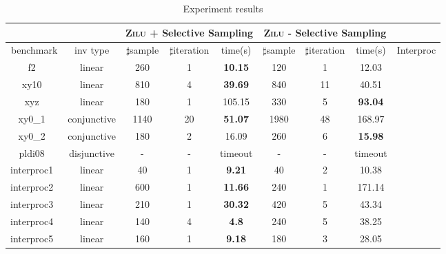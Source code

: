 \begin{table}[t]
\scriptsize
\centering
\caption{Experiment results}
\begin{tabular}{l c | c c c | c c c | c }
\cline{3-8}
& &\multicolumn{3}{|c|}{\textsc{Zilu} + Selective Sampling}&\multicolumn{3}{c|}{\textsc{Zilu} - Selective Sampling} & \\
\hline
\multicolumn{1}{|c|}{benchmark}&\multicolumn{1}{|c|}{inv type}& $\sharp$sample & $\sharp$iteration & time(s) & $\sharp$sample & $\sharp$iteration &time(s) & \multicolumn{1}{|c|}{Interproc} \\
\hline %
\multicolumn{1}{|c|}{f2~\cite{DBLP:conf/pldi/GulwaniSV08}}         						&linear 		&260 &1 &\textbf{10.15}  		&120 &1   &12.03  			&\multicolumn{1}{|c|}{\cmark} \\
\multicolumn{1}{|c|}{xy10~\cite{sharma2012interpolants}} 	        					&linear 		&810 &4 &\textbf{39.69} 		&840  &11  &40.51  			&\multicolumn{1}{|c|}{\cmark} \\
\multicolumn{1}{|c|}{xyz~\cite{sharma2012interpolants}}   	      					&linear 		&180 &1 &105.15  				&330  &5  &\textbf{93.04}  	&\multicolumn{1}{|c|}{\cmark} \\
\multicolumn{1}{|c|}{xy0\_1~\cite{sharma2012interpolants}}         					&conjunctive 	&1140 &20 &\textbf{51.07}		&1980 &48 &168.97  			&\multicolumn{1}{|c|}{\cmark} \\
\multicolumn{1}{|c|}{xy0\_2~\cite{sharma2012interpolants}}         					&conjunctive 	&180  &2 &16.09					&260 &6 &\textbf{15.98}  	&\multicolumn{1}{|c|}{\cmark} \\
\multicolumn{1}{|c|}{pldi08~\cite{gulavani2008automatically}} 		        			&disjunctive 	&- & - &timeout  				&-  &-  &timeout  		&\multicolumn{1}{|c|}{\xmark} \\

\multicolumn{1}{|c|}{interproc1~\cite{jeannet2010interproc}}         				&linear 		&40 &1 &\textbf{9.21}  			&40 &2   &10.38  			&\multicolumn{1}{|c|}{\cmark} \\
\multicolumn{1}{|c|}{interproc2~\cite{jeannet2010interproc}}         				&linear 		&600 &1 &\textbf{11.66} 		&240  &1  &171.14  			&\multicolumn{1}{|c|}{\cmark} \\
\multicolumn{1}{|c|}{interproc3~\cite{jeannet2010interproc}}         				&linear 		&210 &1 &\textbf{30.32}  		&420 &5   &43.34  			&\multicolumn{1}{|c|}{\cmark} \\
\multicolumn{1}{|c|}{interproc4~\cite{jeannet2010interproc}}         				&linear 		&140 &4 &\textbf{4.8}  			&240 &5   &38.25  			&\multicolumn{1}{|c|}{\xmark} \\
\multicolumn{1}{|c|}{interproc5~\cite{jeannet2010interproc}}         				&linear 		&160 &1 &\textbf{9.18}  		&180 &3   &28.05  			&\multicolumn{1}{|c|}{\cmark} \\


\end{tabular}
\end{table}
